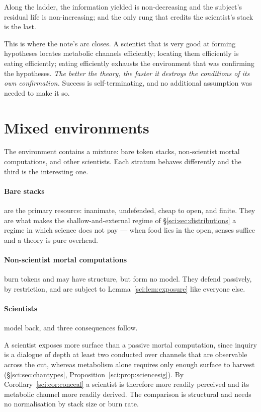 \begin{proposition}\label{sci:opposition-monotone}
Along the ladder, the information yielded is non-decreasing and the subject's residual life is
non-increasing; and the only rung that credits the scientist's stack is the last.
\end{proposition}

This is where the note's arc closes. A scientist that is very good at forming hypotheses locates
metabolic channels efficiently; locating them efficiently is eating efficiently; eating efficiently
exhausts the environment that was confirming the hypotheses. \emph{The better the theory, the faster
it destroys the conditions of its own confirmation.} Success is self-terminating, and no additional
assumption was needed to make it so.

\section{Mixed environments}\label{sci:S10}
\label{sci:sec:mixed}

The environment contains a mixture: bare token stacks, non-scientist mortal computations, and other
scientists. Each stratum behaves differently and the third is the interesting one.

\paragraph{Bare stacks} are the primary resource: inanimate, undefended, cheap to open, and finite.
They are what makes the shallow-and-external regime of \S\ref{sci:sec:distributions} a regime in which
science does not pay --- when food lies in the open, senses suffice and a theory is pure overhead.

\paragraph{Non-scientist mortal computations} burn tokens and may have structure, but form no model.
They defend passively, by restriction, and are subject to Lemma~\ref{sci:lem:exposure} like everyone else.

\paragraph{Scientists} model back, and three consequences follow.

\begin{proposition}
\label{sci:prop:preferredprey}
A scientist exposes more surface than a passive mortal computation, since inquiry is a dialogue of
depth at least two conducted over channels that are observable across the cut, whereas metabolism
alone requires only enough surface to harvest (\S\ref{sci:sec:chantypes},
Proposition~\ref{sci:prop:sciencesig}). By Corollary~\ref{sci:cor:conceal} a scientist is therefore more
readily perceived and its metabolic channel more readily derived. The comparison is structural and
needs no normalisation by stack size or burn rate.
\end{proposition}

